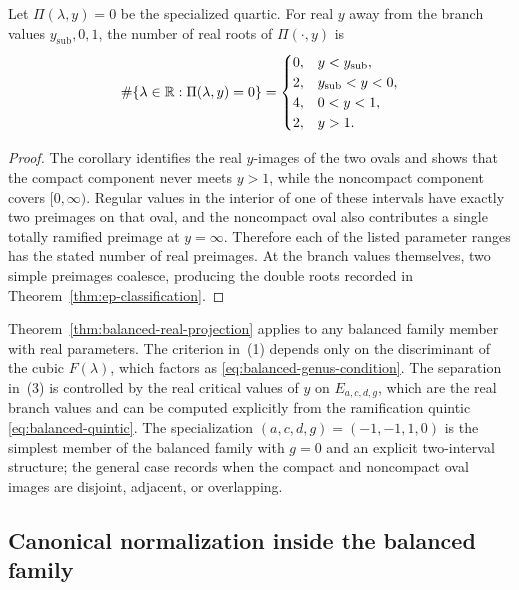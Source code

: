 \begin{proposition}\label{prop:real-fibers-specialization}
Let $\Pi(\lambda,y)=0$ be the specialized quartic.
For real $y$ away from the branch values $y_{\mathrm{sub}},0,1$, the number of real roots of $\Pi(\cdot,y)$ is
\[
\#\{\lambda\in\mathbb{R}:\Pi(\lambda,y)=0\}
=
\begin{cases}
0, & y<y_{\mathrm{sub}},\\
2, & y_{\mathrm{sub}}<y<0,\\
4, & 0<y<1,\\
2, & y>1.
\end{cases}
\]
\end{proposition}

\begin{proof}
The corollary identifies the real $y$-images of the two ovals and shows that the compact component never meets $y>1$, while the noncompact component covers $[0,\infty)$.
Regular values in the interior of one of these intervals have exactly two preimages on that oval, and the noncompact oval also contributes a single totally ramified preimage at $y=\infty$.
Therefore each of the listed parameter ranges has the stated number of real preimages.
At the branch values themselves, two simple preimages coalesce, producing the double roots recorded in Theorem~\ref{thm:ep-classification}.
\end{proof}

\begin{remark}\label{rem:balanced-family-generality}
Theorem~\ref{thm:balanced-real-projection} applies to any balanced family member with real parameters.
The criterion in~(1) depends only on the discriminant of the cubic $F(\lambda)$, which factors as \eqref{eq:balanced-genus-condition}.
The separation in~(3) is controlled by the real critical values of $y$ on $E_{a,c,d,g}$, which are the real branch values and can be computed explicitly from the ramification quintic \eqref{eq:balanced-quintic}.
The specialization $(a,c,d,g)=(-1,-1,1,0)$ is the simplest member of the balanced family with $g=0$ and an explicit two-interval structure; the general case records when the compact and noncompact oval images are disjoint, adjacent, or overlapping.
\end{remark}

\subsection{Canonical normalization inside the balanced family}

